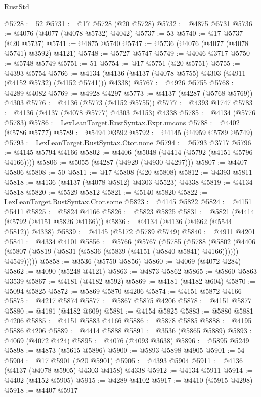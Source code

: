 \begin{lexlean}{RustStd}
\begin{coremodule}
{\begin{coremodule}
{{{{{{{{{{{{{{{{{{{{{{{{{{{{{{{{{{{{{{{{{{{{{{{{{{@5728 := 52
@5731 := @17 @5728 (@20 @5728)
@5732 := @4875 @5731
@5736 := @4076 (@4077 (@4078 @5732) @4042)
@5737 := 53
@5740 := @17 @5737 (@20 @5737)
@5741 := @4875 @5740
@5747 := @5736 (@4076 (@4077 (@4078 @5741) @3592) @4121)
@5748 := @5727 @5747
@5749 := @4046 @3717
@5750 := @5748 @5749
@5751 := 51
@5754 := @17 @5751 (@20 @5751)
@5755 := @4393 @5754
@5766 := @4134 (@4136 (@4137 (@4078 @5755) @4303 (@4911 (@4152 @5732) (@4152 @5741))) @4338)
@5767 := @4926 @5755
@5768 := @4289 @4082
@5769 := @4928 @4297
@5773 := @4137 (@4287 (@5768 @5769)) @4303
@5776 := @4136 (@5773 (@4152 @5755))
@5777 := @4393 @1747
@5783 := @4136 (@4137 (@4078 @5777) @4303 @4153) @4338
@5785 := @4134 (@5776 @5783)
@5786 := LexLeanTarget.RustSyntax.Expr.uncons
@5788 := @4402 (@5786 @5777)
@5789 := @5494 @3592
@5792 := @4145 (@4959 @5789 @5749)
@5793 := LexLeanTarget.RustSyntax.Ctor.none
@5794 := @5793 @3717
@5796 := @4145 @5794 @4166
@5802 := @4406 (@5048 (@4414 (@5792 (@4151 @5796 @4166))))
@5806 := @5055 (@4287 (@4929 (@4930 @4297)))
@5807 := @4407 @5806
@5808 := 50
@5811 := @17 @5808 (@20 @5808)
@5812 := @4393 @5811
@5818 := @4136 (@4137 (@4078 @5812) @4303 @5523) @4338
@5819 := @4134 @5818
@5820 := @5529 @5812
@5821 := @5140 @5820
@5822 := LexLeanTarget.RustSyntax.Ctor.some
@5823 := @4145 @5822
@5824 := @4151 @5411
@5825 := @5824 @4166
@5826 := @5823 @5825
@5831 := @5821 (@4414 (@5792 (@4151 @5826 @4166)))
@5836 := @4134 (@4136 (@4662 (@5544 @5812)) @4338)
@5839 := @4145 (@5172 @5789 @5749)
@5840 := @4911 @4201
@5841 := @4334 @4101
@5856 := @5766
    (@5767
      (@5785
        (@5788
          (@5802
            (@4406 (@5807 (@5819 (@5831 (@5836 (@5839 (@4151 (@5840 @5841) @4166)))))) @4549)))))
@5858 := @3536 (@5750 @5856)
@5860 := @4069 (@4072 @284)
@5862 := @4090 (@5248 @4121)
@5863 := @4873 @5862
@5865 := @5860 @5863 @3539
@5867 := @4181 (@4182 @592)
@5869 := @4181 (@4182 @604)
@5870 := @5094 @5825
@5872 := @5869 @5870 @4206
@5874 := @4151 @5872 @4166
@5875 := @4217 @5874
@5877 := @5867 @5875 @4206
@5878 := @4151 @5877
@5880 := @4181 (@4182 @609)
@5881 := @4154 @5825
@5883 := @5880 @5881 @4206
@5885 := @4151 @5883 @4166
@5886 := @5878 @5885
@5888 := @4195 @5886 @4206
@5889 := @4414 @5888
@5891 := @3536 (@5865 @5889)
@5893 := @4069 (@4072 @424)
@5895 := @4076 (@4093 @3638)
@5896 := @5895 @5249
@5898 := @4873 (@5615 @5896)
@5900 := @5893 @5898 @4905
@5901 := 54
@5904 := @17 @5901 (@20 @5901)
@5905 := @4393 @5904
@5911 := @4136 (@4137 (@4078 @5905) @4303 @4158) @4338
@5912 := @4134 @5911
@5914 := @4402 (@4152 @5905)
@5915 := @4289 @4102
@5917 := @4410 (@5915 @4298)
@5918 := @4407 @5917
}}}}}}}}}}}}}}}}}}}}}}}}}}}}}}}}}}}}}}}}}}}}}}}}}}
\end{coremodule}}
\end{coremodule}
\end{lexlean}
